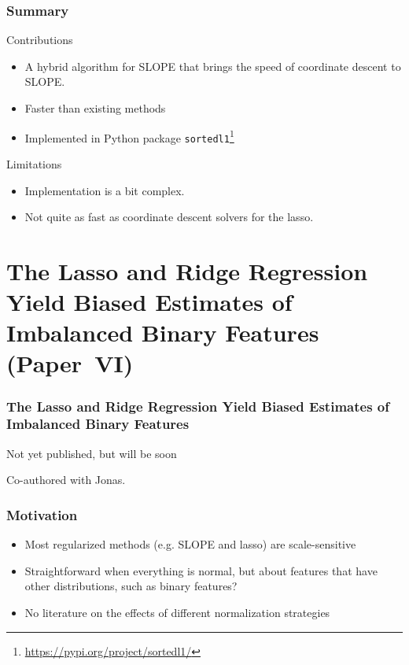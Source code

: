 \documentclass[10pt]{beamer}
\begin{document}
\begin{frame}[c]
  \frametitle{Summary}

  \begin{exampleblock}{Contributions}
    \begin{itemize}
      \item A hybrid algorithm for SLOPE that brings the speed of coordinate descent to SLOPE.
      \item Faster than existing methods
      \item Implemented in Python package
            \texttt{sortedl1}\footnote{\url{https://pypi.org/project/sortedl1/}}
    \end{itemize}
  \end{exampleblock}

  \pause

  \begin{alertblock}{Limitations}
    \begin{itemize}
      \item Implementation is a bit complex.
      \item Not quite as fast as coordinate descent solvers for the lasso.
    \end{itemize}
  \end{alertblock}
\end{frame}

\section{The Lasso and Ridge Regression Yield Biased Estimates of Imbalanced Binary Features (Paper~VI)}

\begin{frame}[c]
  \frametitle{The Lasso and Ridge Regression Yield Biased Estimates of Imbalanced Binary Features}

  Not yet published, but will be soon\texttrademark

  \bigskip

  Co-authored with Jonas.
\end{frame}

\begin{frame}[c]
  \frametitle{Motivation}

  \begin{itemize}[<+->]
    \item Most regularized methods (e.g. SLOPE and lasso) are scale-sensitive
    \item Straightforward when everything is normal, but about features that have other
          distributions, such as binary features?
    \item No literature on the effects of different normalization strategies
  \end{itemize}
\end{frame}
\end{document}
